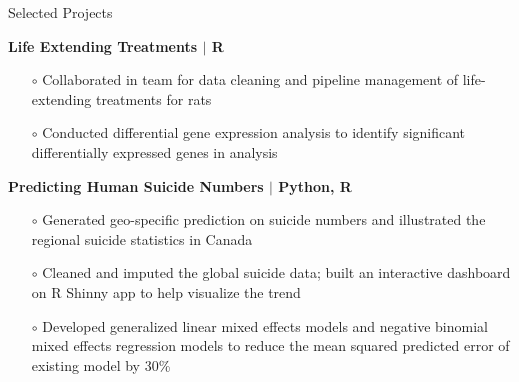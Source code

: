 \documentclass[]{resume}
\begin{document}
\begin{rSection}{\sc Selected Projects}
\item {\textbf{Life Extending Treatments $\mid$ R}}
\vspace{-0.5em}\begin{itemize}\itemsep-0.5em 
 \item [$\circ$]Collaborated in team for data cleaning and pipeline management of life-extending treatments for rats
 \item [$\circ$]
Conducted differential gene expression analysis to identify significant differentially expressed genes in analysis \end{itemize}
\item {\textbf{Predicting Human Suicide Numbers  $\mid$ Python, R}}
\vspace{-0.5em}\begin{itemize}\itemsep-0.5em
 \item [$\circ$]Generated geo-specific prediction on suicide numbers and illustrated the regional suicide statistics in Canada
 \item [$\circ$] Cleaned and imputed the global suicide data; built an interactive dashboard on R Shinny app to help visualize the trend
 \item [$\circ$]
Developed generalized linear mixed effects models and negative binomial mixed effects regression models to reduce the
mean squared predicted error of existing model by 30\%
\end{itemize}
 \end{rSection}
 \vspace{-0.7em}
\end{document}
